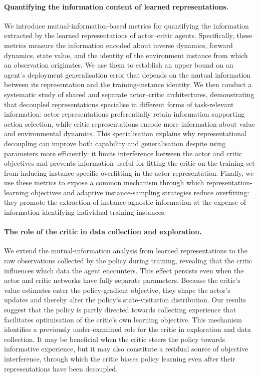 \paragraph{Quantifying the information content of learned representations.}
We introduce mutual-information-based metrics for quantifying the information extracted by the learned representations of actor--critic agents. Specifically, these metrics measure the information encoded about inverse dynamics, forward dynamics, state value, and the identity of the environment instance from which an observation originates. We use them to establish an upper bound on an agent's deployment generalisation error that depends on the mutual information between its representation and the training-instance identity. We then conduct a systematic study of shared and separate actor--critic architectures, demonstrating that decoupled representations specialise in different forms of task-relevant information: actor representations preferentially retain information supporting action selection, while critic representations encode more information about value and environmental dynamics. This specialisation explains why representational decoupling can improve both capability and generalisation despite using parameters more efficiently: it limits interference between the actor and critic objectives and prevents information useful for fitting the critic on the training set from inducing instance-specific overfitting in the actor representation. Finally, we use these metrics to expose a common mechanism through which representation-learning objectives and adaptive instance-sampling strategies reduce overfitting: they promote the extraction of instance-agnostic information at the expense of information identifying individual training instances.

\paragraph{The role of the critic in data collection and exploration.}
We extend the mutual-information analysis from learned representations to the raw observations collected by the policy during training, revealing that the critic influences which data the agent encounters. This effect persists even when the actor and critic networks have fully separate parameters. Because the critic's value estimates enter the policy-gradient objective, they shape the actor's updates and thereby alter the policy's state-visitation distribution. Our results suggest that the policy is partly directed towards collecting experience that facilitates optimisation of the critic's own learning objective. This mechanism identifies a previously under-examined role for the critic in exploration and data collection. It may be beneficial when the critic steers the policy towards informative experience, but it may also constitute a residual source of objective interference, through which the critic biases policy learning even after their representations have been decoupled.

